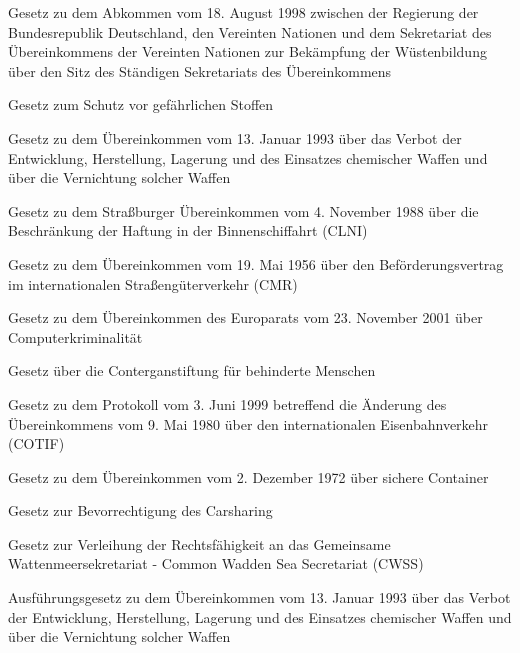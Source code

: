 \item[{CCDSekrSitzAbkG}] Gesetz zu dem Abkommen vom 18. August 1998 zwischen der Regierung der Bundesrepublik Deutschland, den Vereinten Nationen und dem Sekretariat des Übereinkommens der Vereinten Nationen zur Bekämpfung der Wüstenbildung über den Sitz des Ständigen Sekretariats des Übereinkommens

\item[{ChemG}] Gesetz zum Schutz vor gefährlichen Stoffen

\item[{ChemWaffÜbkG}] Gesetz zu dem Übereinkommen vom 13. Januar 1993 über das Verbot der Entwicklung, Herstellung, Lagerung und des Einsatzes chemischer Waffen und über die Vernichtung solcher Waffen

\item[{CLNIG}] Gesetz zu dem Straßburger Übereinkommen vom 4. November 1988 über die Beschränkung der Haftung in der Binnenschiffahrt (CLNI)

\item[{CMRG}] Gesetz zu dem Übereinkommen vom 19. Mai 1956 über den Beförderungsvertrag im internationalen Straßengüterverkehr (CMR)

\item[{ComKrimÜbkG}] Gesetz zu dem Übereinkommen des Europarats vom 23. November 2001 über Computerkriminalität

\item[{ContStifG}] Gesetz über die Conterganstiftung für behinderte Menschen

\item[{COTIFÄndProtG}] Gesetz zu dem Protokoll vom 3. Juni 1999 betreffend die Änderung des Übereinkommens vom 9. Mai 1980 über den internationalen Eisenbahnverkehr (COTIF)

\item[{CSCG}] Gesetz zu dem Übereinkommen vom 2. Dezember 1972 über sichere Container

\item[{CsgG}] Gesetz zur Bevorrechtigung des Carsharing

\item[{CWSSRechtsG}] Gesetz zur Verleihung der Rechtsfähigkeit an das Gemeinsame Wattenmeersekretariat - Common Wadden Sea Secretariat (CWSS)

\item[{CWÜAG}] Ausführungsgesetz zu dem Übereinkommen vom 13. Januar 1993 über das Verbot der Entwicklung, Herstellung, Lagerung und des Einsatzes chemischer Waffen und über die Vernichtung solcher Waffen

